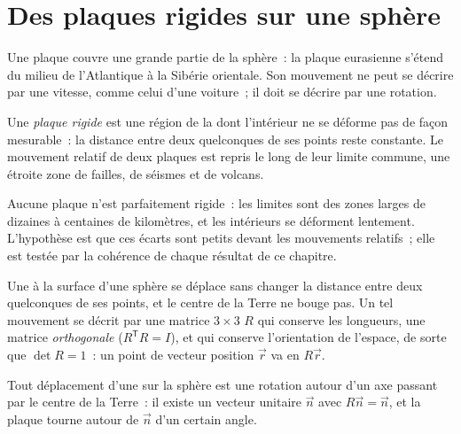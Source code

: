 \section{Des plaques rigides sur une sphère}

Une plaque couvre une grande partie de la sphère~: la plaque eurasienne s'étend du
milieu de l'Atlantique à la Sibérie orientale. Son mouvement ne peut se décrire par une vitesse, comme
celui d'une voiture~; il doit se décrire par une rotation.

\begin{definition}\label{def:b1:plate-kinematics:rigid-plate}
Une \emph{plaque rigide} est une région de la  dont
l'intérieur ne se déforme pas de façon mesurable~: la distance entre deux quelconques de ses points
reste constante. Le mouvement relatif de deux plaques est repris le long de leur
limite commune, une étroite zone de failles, de séismes et de volcans.
\end{definition}

Aucune plaque n'est parfaitement rigide~: les limites sont des zones larges de dizaines à
centaines de kilomètres, et les intérieurs se déforment lentement. L'hypothèse est que ces
écarts sont petits devant les mouvements relatifs~; elle est testée par la
cohérence de chaque résultat de ce chapitre.

Une  à la surface d'une sphère se déplace sans changer la distance
entre deux quelconques de ses points, et le centre de la Terre ne bouge pas. Un tel
mouvement se décrit par une matrice $3\times3$ $R$ qui conserve les longueurs, une matrice
\emph{orthogonale} ($R^{\mathsf T}R = I$), et qui conserve l'orientation
de l'espace, de sorte que $\det R = 1$~: un point de vecteur position $\vec r$ va en
$R\vec r$.

\begin{theorem}\label{thm:b1:plate-kinematics:euler}
Tout déplacement d'une  sur la sphère est une rotation autour d'un axe
passant par le centre de la Terre~: il existe un vecteur unitaire $\vec n$ avec
$R\vec n = \vec n$, et la plaque tourne autour de $\vec n$ d'un certain angle.
\end{theorem}

